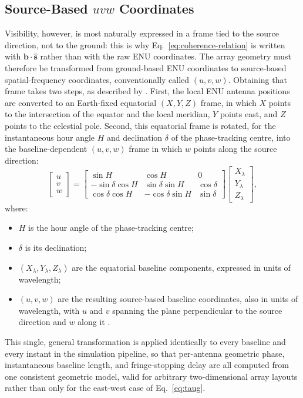 \subsection{Source-Based \texorpdfstring{$uvw$}{uvw} Coordinates}
\label{subsec:uvw-transform}
Visibility, however, is most naturally expressed in a frame tied to the
source direction, not to the ground: this is why Eq.~\eqref{eq:coherence-relation}
is written with $\bm{b}\cdot\hat{\bm{s}}$ rather than with the raw ENU
coordinates. The array geometry must therefore be transformed from
ground-based ENU coordinates to source-based spatial-frequency coordinates,
conventionally called $(u,v,w)$. Obtaining that frame takes two steps, as
described by \citet{taylor1999synthesis}. First, the local ENU antenna
positions are converted to an Earth-fixed equatorial $(X,Y,Z)$ frame, in which
$X$ points to the intersection of the equator and the local meridian, $Y$
points east, and $Z$ points to the celestial pole. Second, this equatorial
frame is rotated, for the instantaneous hour angle $H$ and declination
$\delta$ of the phase-tracking centre, into the baseline-dependent $(u,v,w)$
frame in which $w$ points along the source direction:
\begin{equation}
  \begin{bmatrix} u\\ v\\ w \end{bmatrix}
  =
  \begin{bmatrix}
    \sin H & \cos H & 0\\
    -\sin\delta\cos H & \sin\delta\sin H & \cos\delta\\
    \cos\delta\cos H & -\cos\delta\sin H & \sin\delta
  \end{bmatrix}
  \begin{bmatrix} X_\lambda\\ Y_\lambda\\ Z_\lambda \end{bmatrix},
  \label{eq:uvw}
\end{equation}
where:
\begin{itemize}[leftmargin=1.5em,itemsep=1pt,topsep=2pt]
  \item $H$ is the hour angle of the phase-tracking centre;
  \item $\delta$ is its declination;
  \item $(X_\lambda,Y_\lambda,Z_\lambda)$ are the equatorial baseline
        components, expressed in units of wavelength;
  \item $(u,v,w)$ are the resulting source-based baseline coordinates, also
        in units of wavelength, with $u$ and $v$ spanning the plane
        perpendicular to the source direction and $w$ along it
        \citep{taylor1999synthesis,tms2017}.
\end{itemize}
This single, general transformation is applied identically to every baseline
and every instant in the simulation pipeline, so that per-antenna geometric
phase, instantaneous baseline length, and fringe-stopping delay are all
computed from one consistent geometric model, valid for arbitrary
two-dimensional array layouts rather than only for the east-west case of
Eq.~\eqref{eq:taug}.

